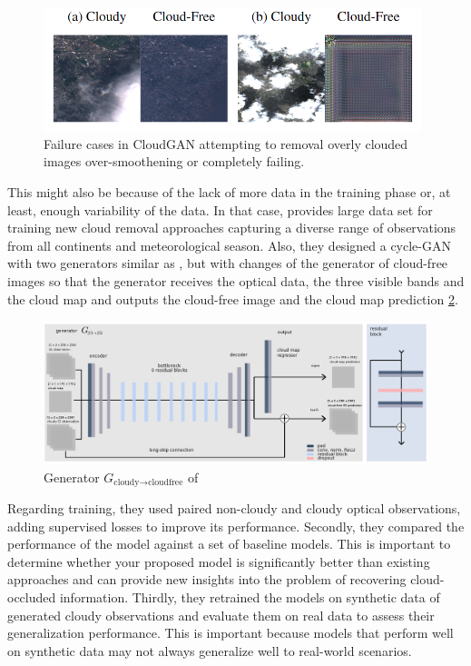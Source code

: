 \documentclass[11pt, a4paper]{article}
\begin{document}
	\begin{figure}[H]
		\centering
		\includegraphics[width=11cm]{imgs/relatedwork/cycle-gan-fail.png}
		\caption{Failure cases in CloudGAN attempting to removal overly clouded images over-smoothening or completely failing.}
		\label{fig:related-cloudy-gan-fail}
	\end{figure}
	This might also be because of the lack of more data in the training phase or, at least, enough variability of the data. In that case, \cite{sen12mscr} provides  large data
	set for training new cloud removal approaches capturing a diverse range of observations from all continents
	and meteorological season. Also, they designed a cycle-GAN with two generators similar as \cite{}, but with changes of the generator of cloud-free images so that the generator receives the optical data, the three visible bands and the cloud map and outputs the cloud-free image and the cloud map prediction \ref{fig:sen12mscr-gen}. 
	\begin{figure}[H]
		\centering
		\includegraphics[width=13cm]{imgs/relatedwork/sen12mscr-gen-model}
		\caption{Generator $G_{\text{cloudy} \rightarrow \text{cloudfree}}$ of \cite{sen12mscr}}
		\label{fig:sen12mscr-gen}
	\end{figure}
	Regarding training, they used paired non-cloudy and cloudy optical observations, adding supervised losses to improve its performance. Secondly, they compared the performance of the model against a set of baseline models. This is important to determine whether your proposed model is significantly better than existing approaches and can provide new insights into the problem of recovering cloud-occluded information.
	Thirdly, they retrained the models on synthetic data of generated cloudy observations and evaluate them on real data to assess their generalization performance. This is important because models that perform well on synthetic data may not always generalize well to real-world scenarios. 
\end{document}
